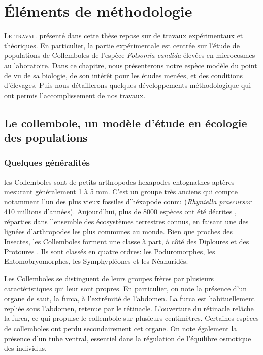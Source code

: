 \chapter{Éléments de méthodologie}
\label{chap:method}

\lettrine[lines=3]{L}{e travail} présenté dans cette thèse repose sur de travaux
expérimentaux et théoriques. En particulier, la partie expérimentale est centrée sur l'étude de
populations de Collemboles de l'espèce \textit{Folsomia candida} élevées en
microcosmes au laboratoire. Dans ce chapitre, nous présenterons notre espèce
modèle du point de vu de sa biologie, de son intérêt pour les études menées, et
des conditions d'élevages. Puis nous détaillerons quelques développements
méthodologique qui ont permis l'accomplissement de nos travaux. 

\section{Le collembole, un modèle d'étude en écologie des populations}

\subsection{Quelques généralités}

les Collemboles sont de petits arthropodes hexapodes entognathes aptères
mesurant généralement 1 à 5 mm. C'est un groupe très anciens qui compte
notamment l'un des plus vieux fossiles d'héxapode connu (\textit{Rhyniella
praecursor} 410 millions d'années). Aujourd'hui, plus de 8000 espèces ont été
décrites \autocites{bellinger2014a}, réparties dans l'ensemble des écosystèmes
terrestres connus, en faisant une des lignées d'arthropodes les plus communes au
monde.
Bien que proches des Insectes, les Collemboles forment une classe à part, à côté des
Diploures et des Protoures \autocites{grimaldi2010a}. Ils sont
classés en quatre ordres: les Poduromorphes, les Entomobryomorphes, les
Symphypléones et les Néanuridés.

Les Collemboles se distinguent de leurs groupes frères par plusieurs
caractéristiques qui leur sont propres. En particulier, on note la présence
d'un organe de saut, la furca, à l'extrémité de l'abdomen. La furca est
habituellement repliée sous l'abdomen, retenue par le rétinacle. L'ouverture du
rétinacle relâche la furca, ce qui propulse le collembole sur plusieurs
centimètres. Certaines espèces de collemboles ont perdu secondairement cet
organe. On note également la présence d'un tube ventral, essentiel dans la
régulation de l'équilibre osmotique des individus.

